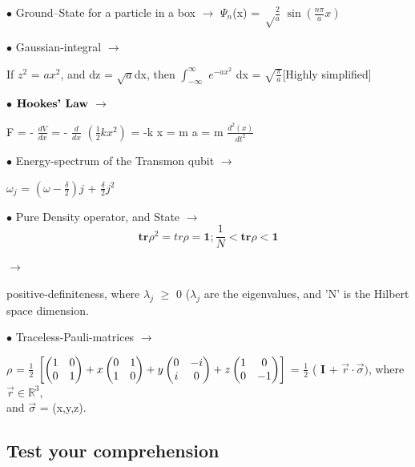 \documentclass[a4paper, 10pt, onepage]{elegantbook}
\begin{document}
{$\bullet$ Ground--State for a particle in a box $\longrightarrow$ $\Psi_n$(x) = ${\sqrt 
\frac{2}{a}}$ $\sin \left( \frac{n \pi}{a}x \right)$  

$\bullet$ Gaussian-integral $\longrightarrow$  

If $z^2$ = ${a}x^2$, and dz = $\sqrt{a}$dx, then $\int_{- \infty}^\infty$ $e^{- a x^2}$ dx = $\sqrt{ 
\frac{\pi}{a}}$[Highly simplified] 

$\bullet$ $\mathbf{\textbf{Hookes' Law}\index{Hookes' Law}}$ $\longrightarrow$ 

F = - $\frac{dV}{dx}$ = - $\frac{d}{dx}$ $\left( \frac{1}{2} k {x^2} \right)$ = -k x = m a = m $\frac{d^2(x)}{dt^2}$ 

$\bullet$ Energy-spectrum of the Transmon qubit $\longrightarrow$  

$\omega_j$ = $\left( \omega - \frac{\delta}{2} \right) j$ + $\frac{\delta}{2} j^2$ 

$\bullet$ Pure Density operator, and State $\longrightarrow$ 
\begin{equation}
\mathbf{tr} \rho^2 = tr \rho = \mathbf{1} ; \frac{1}{N} < \mathbf{tr} \rho < \mathbf{1}
\end{equation}

$\rightarrow$  

positive-definiteness, where $\lambda_j$ $\geq$ 0 ($\lambda_j$ are the eigenvalues, and 'N' is the Hilbert space 
dimension. 

$\bullet$ Traceless-Pauli-matrices $\longrightarrow$  

$\rho$ = $\frac{1}{2}$ $\left[ \begin{pmatrix}1 & 0 \cr 0 & 1 \end{pmatrix} + x \begin{pmatrix}0 & 1 \cr 1 & 0 
\end{pmatrix} + y \begin{pmatrix}0 & -i \cr i & 0  \\ \end{pmatrix} + z \begin{pmatrix}1 & 0 \cr 0 & -1 \end{pmatrix} 
\right]$  = $\frac{1}{2}$ ( $\mathbf{I}$ + $\vec{r} \cdot \vec{\sigma})$, where $\vec{r} \in \mathbb R^3$,\\ and 
$\vec{\sigma}$ = (x,y,z). \\

\subsection{Test your comprehension}

}
\end{document}
